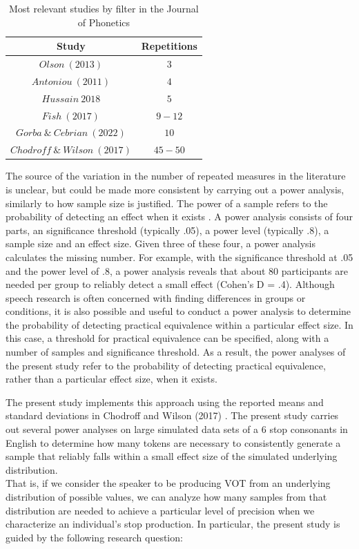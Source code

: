 \documentclass[
  a4paper,
  11pt,
  twocolumn]{article}
\begin{document}
\begin{table}[!ht]
  \caption{Most relevant studies by filter in the Journal of Phonetics}
  \label{tab:decibel}
  \begin{center}
  \begin{tabular}{|c|c|}
  \hline
  \rowcolor[gray]{.75}
  Study    & Repetitions \\
  \hline
  $Olson\ (2013)$   & $3$    \\
  $Antoniou\ (2011)$    & $4$      \\
  $Hussain\ 2018$   & $5$     \\
  $Fish\ (2017)$  & $9-12$     \\
  $Gorba\  \&\ Cebrian\ (2022)$    & $10$      \\
  $Chodroff\ \&\ Wilson\ (2017)$   & $45-50$     \\
  \hline
  \end{tabular}
  \end{center}
\end{table}

The source of the variation in the number of repeated measures in the
literature is unclear, but could be made more consistent by carrying out
a power analysis, similarly to how sample size is justified. The power
of a sample refers to the probability of detecting an effect when it
exists \cite{cohen1992statistical}. A power analysis consists of four
parts, an significance threshold (typically .05), a power level
(typically .8), a sample size and an effect size. Given three of these
four, a power analysis calculates the missing number. For example, with
the significance threshold at .05 and the power level of .8, a power
analysis reveals that about 80 participants are needed per group to
reliably detect a small effect (Cohen's D = .4). Although speech
research is often concerned with finding differences in groups or
conditions, it is also possible and useful to conduct a power analysis
to determine the probability of detecting practical equivalence within a
particular effect size. In this case, a threshold for practical
equivalence can be specified, along with a number of samples and
significance threshold. As a result, the power analyses of the present
study refer to the probability of detecting practical equivalence,
rather than a particular effect size, when it exists.

The present study implements this approach using the reported means and
standard deviations in Chodroff and Wilson (2017)
\cite{chodroff2017structure}. The present study carries out several
power analyses on large simulated data sets of a 6 stop consonants in
English to determine how many tokens are necessary to consistently
generate a sample that reliably falls within a small effect size of the
simulated underlying distribution.\\
That is, if we consider the speaker to be producing VOT from an
underlying distribution of possible values, we can analyze how many
samples from that distribution are needed to achieve a particular level
of precision when we characterize an individual's stop production. In
particular, the present study is guided by the following research
question:
\end{document}
